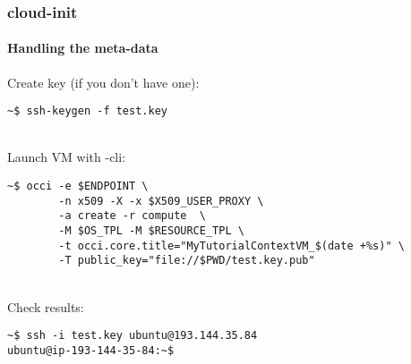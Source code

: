 \begin{frame}[fragile]
  \frametitle{cloud-init}
  \framesubtitle{Handling the meta-data}

  Create key (if you don't have one):
  \begin{Sbox}
  \Fontsmaller
  \begin{minipage}{\linewidth-2\fboxsep-2\fboxrule-4pt}
  \color{white}
  \begin{verbatim}
~$ ssh-keygen -f test.key
  \end{verbatim}
  \end{minipage}
  \end{Sbox}

  \hfill\\

  Launch VM with \rocci-cli:
  \begin{Sbox}
  \Fontsmaller
  \begin{minipage}{\linewidth-2\fboxsep-2\fboxrule-4pt}
  \color{white}
  \begin{verbatim}
~$ occi -e $ENDPOINT \
        -n x509 -X -x $X509_USER_PROXY \
        -a create -r compute  \
        -M $OS_TPL -M $RESOURCE_TPL \
        -t occi.core.title="MyTutorialContextVM_$(date +%s)" \
        -T public_key="file://$PWD/test.key.pub" 
  \end{verbatim}
  \end{minipage}
  \end{Sbox}
  \fcolorbox{black}{black}{\TheSbox}

  \hfill\\

  Check results:
  \begin{Sbox}
  \Fontsmaller
  \begin{minipage}{\linewidth-2\fboxsep-2\fboxrule-4pt}
  \color{white}
  \begin{verbatim}
~$ ssh -i test.key ubuntu@193.144.35.84
ubuntu@ip-193-144-35-84:~$ 
  \end{verbatim}
  \end{minipage}
  \end{Sbox}

\end{frame}



